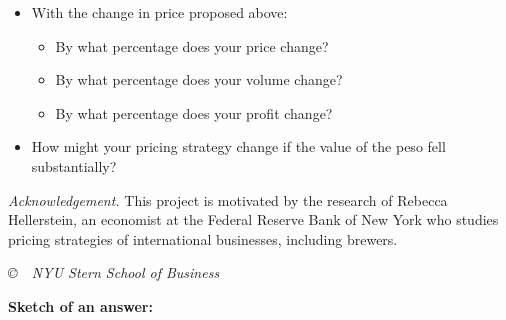 \documentclass[letterpaper,12pt]{article}
\begin{document}
\begin{itemize}
\item With the change in price proposed above:  
\begin{itemize} 
\item By what percentage does your price change?  
\item By what percentage does your volume change?  
\item By what percentage does your profit change?  
\end{itemize}

\item How might your pricing strategy change if the value of the peso 
fell substantially?  

\end{itemize}

{\it Acknowledgement.\/}  This project is motivated by the research 
of Rebecca Hellerstein, 
an economist at the Federal Reserve Bank of New York 
who studies pricing strategies of international businesses, 
including brewers.  


\vfill
\centerline{\it \copyright \ \number\year \ NYU Stern School of Business}


\newpage
{\bf Sketch of an answer:}  
\end{document}
